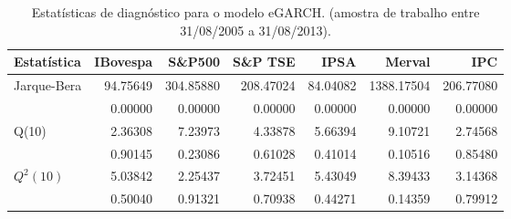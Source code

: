 \begin{table}[H]
\centering
\caption{Estatísticas de diagnóstico para o modelo eGARCH. 
               (amostra de trabalho entre 31/08/2005 a 31/08/2013).} 
\label{tab:garchstats}
\begin{tabular}{lrrrrrr}
  \hline
Estatística & IBovespa & S\&P500 & S\&P TSE & IPSA & Merval & IPC \\ 
  \hline
Jarque-Bera & 94.75649 & 304.85880 & 208.47024 & 84.04082 & 1388.17504 & 206.77080 \\ 
   & 0.00000 & 0.00000 & 0.00000 & 0.00000 & 0.00000 & 0.00000 \\ 
  Q(10) & 2.36308 & 7.23973 & 4.33878 & 5.66394 & 9.10721 & 2.74568 \\ 
   & 0.90145 & 0.23086 & 0.61028 & 0.41014 & 0.10516 & 0.85480 \\ 
  $Q^2(10)$ & 5.03842 & 2.25437 & 3.72451 & 5.43049 & 8.39433 & 3.14368 \\ 
   & 0.50040 & 0.91321 & 0.70938 & 0.44271 & 0.14359 & 0.79912 \\ 
   \hline
\end{tabular}
\end{table}
